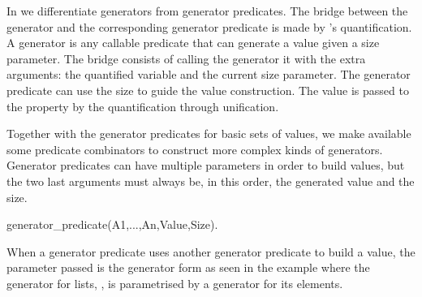 In \plqc{} we differentiate generators from generator predicates.
%
The bridge between the generator and the corresponding generator
predicate is made by \plqc{}'s quantification.
%
A generator is any callable predicate that can generate a value given a
size parameter.
%
The bridge consists of calling the generator it with the extra
arguments: the quantified variable and the current size parameter.
%
The generator predicate can use the size to guide the value
construction.
%
The value is passed to the property by the \plqc{} quantification
through unification.



Together with the generator predicates for basic sets of values, we make
available some predicate combinators to construct more complex kinds of
generators.
%
Generator predicates can have multiple parameters in order to build
values, but the two last arguments must always be, in this order, the
generated value and the size.
%
\begin{yapcode}
 generator_predicate(A1,...,An,Value,Size).
\end{yapcode}
%
When a generator predicate uses another generator predicate to build a
value, the parameter passed is the generator form as seen in the example
where the generator for lists, , is parametrised by a
generator for its elements.
%








